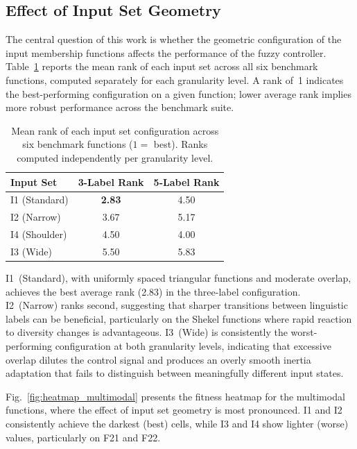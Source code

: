 \subsection{Effect of Input Set Geometry}
\label{subsec:input_geometry}

The central question of this work is whether the geometric configuration of the input membership functions affects the performance of the fuzzy controller. Table~\ref{tab:input_ranking} reports the mean rank of each input set across all six benchmark functions, computed separately for each granularity level. A rank of~1 indicates the best-performing configuration on a given function; lower average rank implies more robust performance across the benchmark suite.

\begin{table}[htbp]
    \caption{Mean rank of each input set configuration across six benchmark functions ($1 =$ best). Ranks computed independently per granularity level.}
    \label{tab:input_ranking}
    \centering
    \begin{tabular}{lcc}
    \toprule
    Input Set & 3-Label Rank & 5-Label Rank \\
    \midrule
    I1 (Standard) & \textbf{2.83} & 4.50 \\
    I2 (Narrow)   & 3.67 & 5.17 \\
    I4 (Shoulder) & 4.50 & 4.00 \\
    I3 (Wide)     & 5.50 & 5.83 \\
    \bottomrule
    \end{tabular}
\end{table}

I1~(Standard), with uniformly spaced triangular functions and moderate overlap, achieves the best average rank (2.83) in the three-label configuration. I2~(Narrow) ranks second, suggesting that sharper transitions between linguistic labels can be beneficial, particularly on the Shekel functions where rapid reaction to diversity changes is advantageous. I3~(Wide) is consistently the worst-performing configuration at both granularity levels, indicating that excessive overlap dilutes the control signal and produces an overly smooth inertia adaptation that fails to distinguish between meaningfully different input states.

Fig.~\ref{fig:heatmap_multimodal} presents the fitness heatmap for the multimodal functions, where the effect of input set geometry is most pronounced. I1 and I2 consistently achieve the darkest (best) cells, while I3 and I4 show lighter (worse) values, particularly on F21 and F22.

